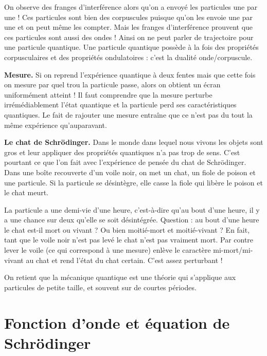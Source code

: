 \documentclass[11pt,class=report,crop=false]{standalone}
\begin{document}
On observe des franges d'interférence alors qu'on a envoyé les particules une par une !
Ces particules sont bien des corpuscules puisque qu'on les envoie une par une et on peut même les compter. Mais les franges d'interférence prouvent que ces particules sont aussi des ondes ! Ainsi on ne peut parler de trajectoire pour une particule quantique. Une particule quantique possède à la fois des propriétés corpusculaires et des propriétés ondulatoires : c'est la \og{}dualité onde/corpuscule\fg{}.

\bigskip

\textbf{Mesure.} 
Si on reprend l'expérience quantique à deux fentes mais que cette fois on mesure par quel trou la particule passe, alors on obtient un écran uniformément atteint !
Il faut comprendre que la mesure perturbe irrémédiablement l'état quantique et la particule perd ses caractéristiques quantiques. Le fait de rajouter une mesure entraîne que ce n'est pas du tout la même expérience qu'auparavant.


\bigskip

\textbf{Le chat de Schrödinger.}
Dans le monde dans lequel nous vivons les objets sont \og{}gros\fg{} et leur appliquer des propriétés quantiques n'a pas trop de sens. C'est pourtant ce que l'on fait avec l'expérience de pensée du chat de Schrödinger. Dans une boîte recouverte d'un voile noir, on met un chat, un fiole de poison et une particule. 
Si la particule se désintègre, elle casse la fiole qui libère le poison et le chat meurt.



La particule a une demi-vie d'une heure, c'est-à-dire qu'au bout d'une heure, il y a une chance sur deux qu'elle se soit désintégrée. 
Question : au bout d'une heure le chat est-il mort ou vivant ? Ou bien moitié-mort et moitié-vivant ? 
En fait, tant que le voile noir n'est pas levé le chat n'est pas vraiment mort. Par contre lever le voile (ce qui correspond à une mesure) enlève le caractère mi-mort/mi-vivant au chat et rend l'état du chat certain.
C'est assez perturbant ! 

On retient que la mécanique quantique est une théorie qui s'applique aux particules de petite taille, et souvent sur de courtes périodes.



\section{Fonction d'onde et équation de Schrödinger}
\end{document}
